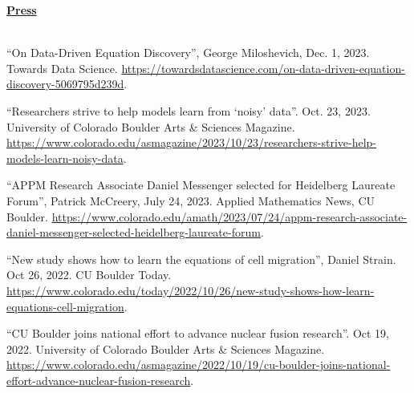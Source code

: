 \documentclass[letterpaper,11pt,oneside]{article}
\newcommand{\headr}[1]{\vspace{10pt}\uline{\Large{\textbf{#1}} \hfill } \\ \vspace{-10pt}\\}
\begin{document}
\headr{Press}
\vspace{-0.5cm}
\begin{sloppypar}
\begin{enumerate}[label={[\arabic*]}]
\item 
\raggedright``On Data-Driven Equation Discovery'', George Miloshevich, Dec. 1, 2023. Towards Data Science. {\footnotesize\url{https://towardsdatascience.com/on-data-driven-equation-discovery-5069795d239d}}.
\item 
\raggedright``Researchers strive to help models learn from ‘noisy’ data''. Oct. 23, 2023. University of Colorado Boulder Arts \& Sciences Magazine. {\footnotesize\url{https://www.colorado.edu/asmagazine/2023/10/23/researchers-strive-help-models-learn-noisy-data}}.
\item 
\raggedright``APPM Research Associate Daniel Messenger selected for Heidelberg Laureate Forum'', Patrick McCreery, July 24, 2023. Applied Mathematics News, CU Boulder. {\footnotesize\url{https://www.colorado.edu/amath/2023/07/24/appm-research-associate-daniel-messenger-selected-heidelberg-laureate-forum}}.
\item \raggedright``New study shows how to learn the equations of cell migration'', Daniel Strain. Oct 26, 2022. CU Boulder Today. {\footnotesize\url{https://www.colorado.edu/today/2022/10/26/new-study-shows-how-learn-equations-cell-migration}}.
\item 
\raggedright``CU Boulder joins national effort to advance nuclear fusion research''. Oct 19, 2022. University of Colorado Boulder Arts \& Sciences Magazine. {\footnotesize\url{https://www.colorado.edu/asmagazine/2022/10/19/cu-boulder-joins-national-effort-advance-nuclear-fusion-research}}.
\end{enumerate}
\end{sloppypar}

\end{document}
